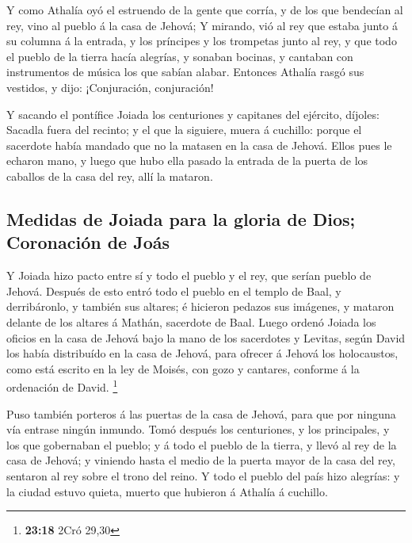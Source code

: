  Y como Athalía oyó el estruendo de la gente que corría, y
de los que bendecían al rey, vino al pueblo á la casa de Jehová;
 Y mirando, vió al rey que estaba junto á su columna á la
entrada, y los príncipes y los trompetas junto al rey, y que todo el
pueblo de la tierra hacía alegrías, y sonaban bocinas, y cantaban con
instrumentos de música los que sabían alabar. Entonces Athalía rasgó sus
vestidos, y dijo: ¡Conjuración, conjuración!

 Y sacando el pontífice Joiada los centuriones y capitanes
del ejército, díjoles: Sacadla fuera del recinto; y el que la siguiere,
muera á cuchillo: porque el sacerdote había mandado que no la matasen en
la casa de Jehová.  Ellos pues le echaron mano, y luego que
hubo ella pasado la entrada de la puerta de los caballos de la casa del
rey, allí la mataron.

\hypertarget{medidas-de-joiada-para-la-gloria-de-dios-coronaciuxf3n-de-jouxe1s}{%
\subsection{Medidas de Joiada para la gloria de Dios; Coronación de
Joás}\label{medidas-de-joiada-para-la-gloria-de-dios-coronaciuxf3n-de-jouxe1s}}

 Y Joiada hizo pacto entre sí y todo el pueblo y el rey,
que serían pueblo de Jehová.  Después de esto entró todo el
pueblo en el templo de Baal, y derribáronlo, y también sus altares; é
hicieron pedazos sus imágenes, y mataron delante de los altares á
Mathán, sacerdote de Baal.  Luego ordenó Joiada los oficios
en la casa de Jehová bajo la mano de los sacerdotes y Levitas, según
David los había distribuído en la casa de Jehová, para ofrecer á Jehová
los holocaustos, como está escrito en la ley de Moisés, con gozo y
cantares, conforme á la ordenación de David. \footnote{\textbf{23:18}
  2Cró 29,30}

 Puso también porteros á las puertas de la casa de Jehová,
para que por ninguna vía entrase ningún inmundo.  Tomó
después los centuriones, y los principales, y los que gobernaban el
pueblo; y á todo el pueblo de la tierra, y llevó al rey de la casa de
Jehová; y viniendo hasta el medio de la puerta mayor de la casa del rey,
sentaron al rey sobre el trono del reino.  Y todo el pueblo
del país hizo alegrías: y la ciudad estuvo quieta, muerto que hubieron á
Athalía á cuchillo.

